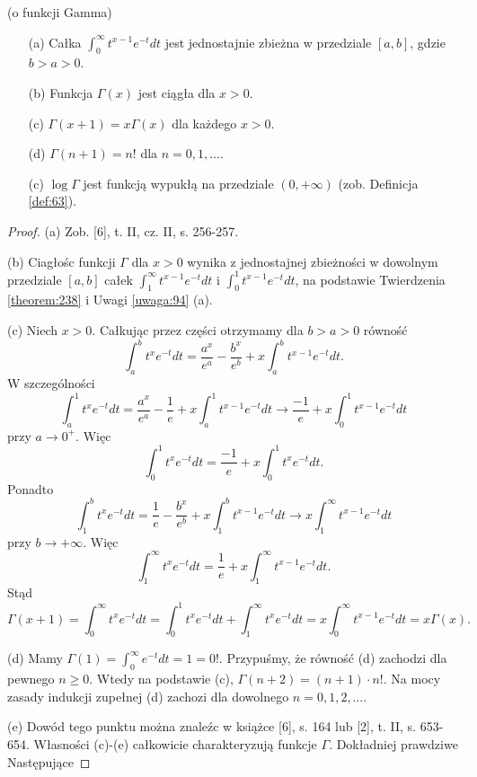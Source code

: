 \documentclass[leqno]{article}
\begin{document}
\begin{justify}
\begin{theorem}
{
    (o funkcji Gamma)
    \begin{itemize}
        \item [(a)]
            Całka $\int_{0}^{\infty}t^{x-1}e^{-t}dt$ jest jednostajnie zbieżna w przedziale $[a,b]$, gdzie $b > a > 0$.
        \item [(b)]
            Funkcja $\Gamma(x)$ jest ciągła dla $x > 0$.
        \item [(c)]
            $\Gamma(x + 1) = x\Gamma(x)$ dla każdego $x > 0$.
        \item [(d)]
            $\Gamma(n+1) = n!$ dla $n = 0,1,\ldots$.
        \item [(c)]
            $\log \Gamma$ jest funkcją wypukłą na przedziale $(0, +\infty)$ (zob. Definicja \ref{def:63}).
    \end{itemize}
}
\end{theorem}

\begin{proof}
    \item [(a)]
        Zob. [6], t. II, cz. II, s. 256-257.
    \item [(b)]
        Ciagłośc funkcji $\Gamma$ dla $x > 0$ wynika z jednostajnej zbieżności w dowolnym przedziale $[a,b]$ całek $\int_{1}^{\infty}t^{x-1}e^{-t}dt$ i $\int_{0}^{1}t^{x-1}e^{-t}dt$,
        na podstawie Twierdzenia \ref{theorem:238} i Uwagi \ref{uwaga:94} (a).
    \item [(c)]
        Niech $x > 0$. Całkując przez części otrzymamy dla $b > a > 0$ równość 
        \[
            \int_{a}^{b}t^x e^{-t}dt = \frac{a^x}{e^a} - \frac{b^x}{e^b} + x\int_{a}^{b}t^{x-1}e^{-t}dt.
        \]
        W szczególności 
        \[
            \int_{a}^{1}t^x e^{-t}dt = \frac{a^x}{e^a} - \frac{1}{e} + x\int_{a}^{1}t^{x-1}e^{-t}dt \to \frac{-1}{e} + x\int_{0}^{1}t^{x-1}e^{-t}dt
        \]
        przy $a \to 0^+$. Więc 
        \[
            \int_{0}^{1}t^x e^{-t}dt = \frac{-1}{e} + x \int_{0}^{1}t^{x} e^{-t}dt.
        \] 
        Ponadto 
        \[
            \int_{1}^{b}t^x e^{-t}dt = \frac{1}{e} - \frac{b^x}{e^b} + x \int_{1}^{b}t^{x-1} e^{-t}dt \to x \int_{1}^{\infty}t^{x-1}e^{-t}dt 
        \]
        przy $b \to +\infty$. Więc 
        \[
            \int_{1}^{\infty}t^x e^{-t}dt = \frac{1}{e} + x \int_{1}^{\infty}t^{x-1}e^{-t}dt.
        \]
        Stąd 
        \[
            \Gamma(x + 1) = \int_{0}^{\infty}t^x e^{-t}dt = \int_{0}^{1}t^x e^{-t}dt + \int_{1}^{\infty}t^x e^{-t}dt = x \int_{0}^{\infty}t^{x-1} e^{-t}dt = x\Gamma(x).
        \]
    \item [(d)]
        Mamy $\Gamma(1) = \int_{0}^{\infty}e^{-t}dt = 1 = 0!$. Przypuśmy, że równość (d) zachodzi dla pewnego $n \geqslant 0$. Wtedy na podstawie (c),
        $\Gamma(n+2) = (n+1) \cdot n!$. Na mocy zasady indukcji zupełnej (d) zachozi dla dowolnego $n = 0, 1, 2, \ldots$. 
    \item [(e)]
        Dowód tego punktu można znaleźc w książce [6], s. 164 lub [2], t. II, s. 653-654.
    Własności (c)-(e) całkowicie charakteryzują funkcje $\Gamma$. Dokładniej prawdziwe Następujące
\end{proof}


\end{justify}
\end{document}
